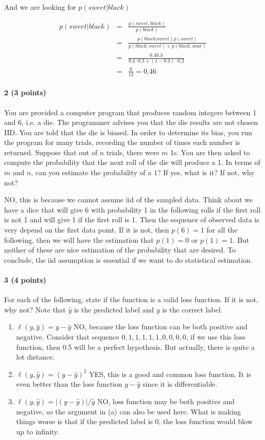 \documentclass[11pt]{article}
\begin{document}
And we are looking for $p(sweet|black)$

\begin{eqnarray*}
  p(sweet|black) &=&  \frac{p(sweet, black)}{p(black)}  \\
  &=& \frac{p(black|sweet)p(sweet)}{p(black,sweet)+p(black,sour)}  \\
  &=&\frac{0.4\dot0.3}{0.4\cdot0.3 + (1-0.3)\cdot0.2 }    \\
  &=&\frac{6}{13}=0.46
\end{eqnarray*}




\paragraph{2 (3 points)} You are provided a computer program that produces random integers between 1 and 6, i.e. a die. The programmer advises you that the die results are not chosen IID. You are told that the die is biased. In order to determine its bias, you run the program for many trials, recording the number of times each number is returned. Suppose that out of $n$ trials, there were $m$ 1s. You are then asked to compute the probability that the next roll of the die will produce a 1. In terms of $m$ and $n$, can you estimate the probability of a $1$? If yes, what is it? If not, why not?

NO, this is because we cannot assume iid of the sampled data. Think about we have a dice that will give 6 with probability 1 in the following rolls if the first roll is not 1 and will give 1 if the first roll is 1. Then the sequence of observed data is very depend on the first data point. If it is not, then $p(6) =1$ for all the following, then we will have the estimation that $p(1) = 0$ or $p(1) = 1$. But neither of these are nice estimation of the probability that are desired. To conclude, the iid assumption is essential if we want to do statistical estimation.

\paragraph{3 (4 points)} For each of the following, state if the function is a valid loss function. If it is not, why not? Note that $\hat{y}$ is the predicted label and $y$ is the correct label. 

\begin{enumerate}
\item $\ell (y, \hat{y}) = y-\hat{y}$ NO, because the loss function can be both positive and negative. Consider that sequence $0,1,1,1,1,1,0,0,0,0$, if we use this loss function, then 0.5 will be a perfect hypothesis. But actually, there is quite a lot distance.
\item $\ell (y, \hat{y}) = (y-\hat{y})^2$ YES, this is a good and common loss function. It is even better than the loss function $y-\hat{y}$ since it is differentiable.
\item $\ell (y, \hat{y}) = |(y-\hat{y})|/\hat{y}$ NO, loss function may be both positive and negative, so the argument in (a) can also be used here. What is making things worse is that if the predicted label is 0, the loss function would blow up to infinity.
\end{enumerate}
\end{document}
